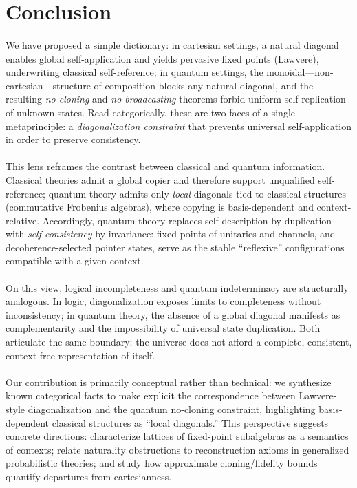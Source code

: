 \documentclass[11pt]{article}
\theoremstyle{upright}
\begin{document}
\section{Conclusion}
\label{sec:conclusion}

\paragraph{}
We have proposed a simple dictionary: in cartesian settings, a natural diagonal enables global self-application and yields pervasive fixed points (Lawvere), underwriting classical self-reference; in quantum settings, the monoidal---non-cartesian---structure of composition blocks any natural diagonal, and the resulting \emph{no-cloning} and \emph{no-broadcasting} theorems forbid uniform self-replication of unknown states. Read categorically, these are two faces of a single metaprinciple: a \emph{diagonalization constraint} that prevents universal self-application in order to preserve consistency.

\paragraph{}
This lens reframes the contrast between classical and quantum information. Classical theories admit a global copier and therefore support unqualified self-reference; quantum theory admits only \emph{local} diagonals tied to classical structures (commutative Frobenius algebras), where copying is basis-dependent and context-relative. Accordingly, quantum theory replaces self-description by duplication with \emph{self-consistency} by invariance: fixed points of unitaries and channels, and decoherence-selected pointer states, serve as the stable ``reflexive'' configurations compatible with a given context.

\paragraph{}
On this view, logical incompleteness and quantum indeterminacy are structurally analogous. In logic, diagonalization exposes limits to completeness without inconsistency; in quantum theory, the absence of a global diagonal manifests as complementarity and the impossibility of universal state duplication. Both articulate the same boundary: the universe does not afford a complete, consistent, context-free representation of itself.

\paragraph{}
Our contribution is primarily conceptual rather than technical: we synthesize known categorical facts to make explicit the correspondence between Lawvere-style diagonalization and the quantum no-cloning constraint, highlighting basis-dependent classical structures as ``local diagonals.'' This perspective suggests concrete directions: characterize lattices of fixed-point subalgebras as a semantics of contexts; relate naturality obstructions to reconstruction axioms in generalized probabilistic theories; and study how approximate cloning/fidelity bounds quantify departures from cartesianness. 
\end{document}
